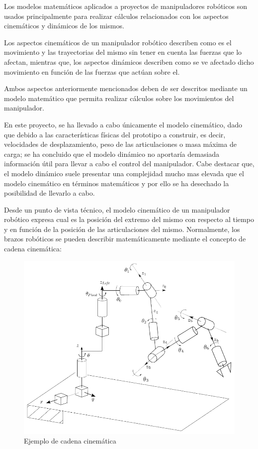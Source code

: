 Los modelos matemáticos aplicados a proyectos de manipuladores robóticos son usados principalmente para realizar cálculos relacionados con los aspectos cinemáticos y dinámicos de los mismos.

Los aspectos cinemáticos de un manipulador robótico describen como es el movimiento y las trayectorias del mismo sin tener en cuenta las fuerzas que lo afectan, mientras que, los aspectos dinámicos describen como se ve afectado dicho movimiento en función de las fuerzas que actúan sobre el.

Ambos aspectos anteriormente mencionados deben de ser descritos mediante un modelo matemático que permita realizar cálculos sobre los movimientos del manipulador. 

En este proyecto, se ha llevado a cabo únicamente el modelo cinemático, dado que debido a las características físicas del prototipo a construir, es decir, velocidades de desplazamiento, peso de las articulaciones o masa máxima de carga; se ha concluido que el modelo dinámico no aportaría demasiada información útil para llevar a cabo el control del manipulador. Cabe destacar que, el modelo dinámico suele presentar una complejidad mucho mas elevada que el modelo cinemático en términos matemáticos y por ello se ha desechado la posibilidad de llevarlo a cabo.

Desde un punto de vista técnico, el modelo cinemático de un manipulador robótico expresa cual es la posición del extremo del mismo con respecto al tiempo y en función de la posición de las articulaciones del mismo. Normalmente, los brazos robóticos se pueden describir matemáticamente mediante el concepto de cadena cinemática:

\begin{figure}[ht!]
    \centering 
    \includegraphics[width=.6\linewidth]{pictures/kinematic chain.png}
    \caption{Ejemplo de cadena cinemática \cite{}}
    \label{fig:}
\end{figure}

